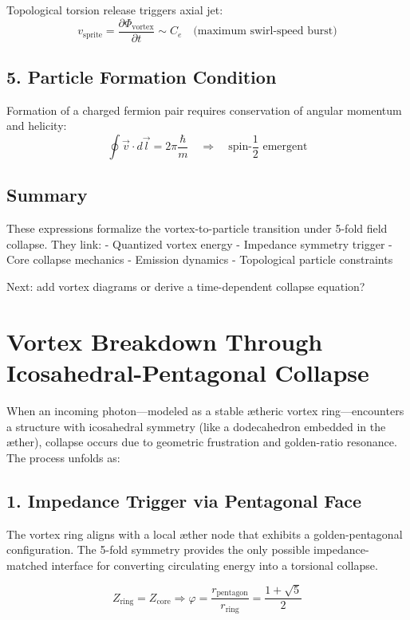 \documentclass[11pt]{article}
\begin{document}
Topological torsion release triggers axial jet:
\begin{equation}
    v_{\text{sprite}} = \frac{\partial \Phi_{\text{vortex}}}{\partial t} \sim C_e \quad \text{(maximum swirl-speed burst)}
\end{equation}

\subsection*{5. Particle Formation Condition}

Formation of a charged fermion pair requires conservation of angular momentum and helicity:
\begin{equation}
    \oint \vec{v} \cdot d\vec{l} = 2\pi \frac{\hbar}{m} \quad \Rightarrow \quad \text{spin-}\frac{1}{2} \text{ emergent}
\end{equation}

\subsection*{Summary}
These expressions formalize the vortex-to-particle transition under 5-fold field collapse. They link:
- Quantized vortex energy
- Impedance symmetry trigger
- Core collapse mechanics
- Emission dynamics
- Topological particle constraints

Next: add vortex diagrams or derive a time-dependent collapse equation?

\section*{Vortex Breakdown Through Icosahedral-Pentagonal Collapse}

When an incoming photon---modeled as a stable ætheric vortex ring---encounters a structure with icosahedral symmetry (like a dodecahedron embedded in the æther), collapse occurs due to geometric frustration and golden-ratio resonance. The process unfolds as:

\subsection*{1. Impedance Trigger via Pentagonal Face}
The vortex ring aligns with a local æther node that exhibits a golden-pentagonal configuration. The 5-fold symmetry provides the only possible impedance-matched interface for converting circulating energy into a torsional collapse.

\begin{equation}
    Z_\text{ring} = Z_\text{core} \Rightarrow \varphi = \frac{r_\text{pentagon}}{r_\text{ring}} = \frac{1+\sqrt{5}}{2}
\end{equation}
\end{document}
